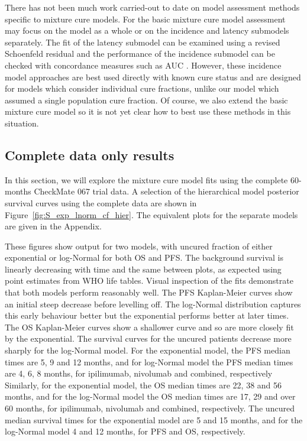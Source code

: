 \documentclass[AMA,STIX1COL]{WileyNJD-v2}
\begin{document}
There has not been much work carried-out to date on model assessment methods specific to mixture cure models.
For the basic mixture cure model assessment may focus on the model as a whole or on the incidence and latency submodels separately.
The fit of the latency submodel can be examined using a revised Schoenfeld residual \cite{Wileyto2013} and the performance of the incidence submodel can be checked with concordance measures such as AUC \cite{Peng2021}.
However, these incidence model approaches are best used directly with known cure status and are designed for models which consider individual cure fractions, unlike our model which assumed a single population cure fraction.
Of course, we also extend the basic mixture cure model so it is not yet clear how to best use these methods in this situation. 

%
\subsection{Complete data only results} \label{sec:results}
In this section, we will explore the mixture cure model fits using the complete 60-months CheckMate 067 trial data.
A selection of the hierarchical model posterior survival curves using the complete data are shown in Figure~\ref{fig:S_exp_lnorm_cf_hier}.
The equivalent plots for the separate models are given in the Appendix.

These figures show output for two models, with uncured fraction of either exponential or log-Normal for both OS and PFS.
The background survival is linearly decreasing with time and the same between plots, as expected using point estimates from WHO life tables.
Visual inspection of the fits demonstrate that both models perform reasonably well.
The PFS Kaplan-Meier curves show an initial steep decrease before levelling off.
The log-Normal distribution captures this early behaviour better but the exponential performs better at later times.
The OS Kaplan-Meier curves show a shallower curve and so are more closely fit by the exponential.
The survival curves for the uncured patients decrease more sharply for the log-Normal model.
For the exponential model, the PFS median times are 5, 9 and 12 months,
and for log-Normal model the PFS median times are 4, 6, 8 months, for ipilimumab, nivolumab and combined, respectively
Similarly, for the exponential model, the OS median times are 22, 38 and 56 months,
and for the log-Normal model the OS median times are 17, 29 and over 60 months, for ipilimumab, nivolumab and combined, respectively.
The uncured median survival times for the exponential model are 5 and 15 months, and for the log-Normal model 4 and 12 months, for PFS and OS, respectively.
\end{document}
